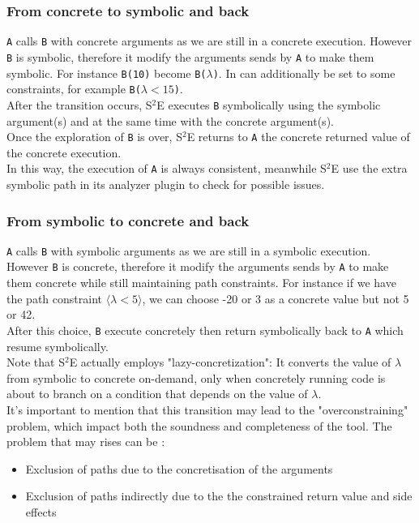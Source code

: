 \documentclass[11pt]{article}
\begin{document}
    		\subsubsection*{From concrete to symbolic and back}
    			\texttt{A} calls \texttt{B} with concrete arguments as we are still in a concrete execution. However \texttt{B} is symbolic, therefore it modify the arguments sends by \texttt{A} to make them symbolic. For instance \texttt{B(10)} become \texttt{B($\lambda$)}. In can additionally be set to some constraints, for example \texttt{B($\lambda < 15$)}.\\
    			After the transition occurs, S$^2$E executes \texttt{B} symbolically using the symbolic argument(s) and at the same time with the concrete argument(s).\\
    			Once the exploration of \texttt{B} is over, S$^2$E returns to \texttt{A} the concrete returned value of the concrete execution.\\
    			In this way, the execution of \texttt{A} is always consistent, meanwhile S$^2$E use the extra symbolic path in its analyzer plugin to check for possible issues.
    			
    		\subsubsection*{From symbolic to concrete and back}
    			\texttt{A} calls \texttt{B} with symbolic arguments as we are still in a symbolic execution. However \texttt{B} is concrete, therefore it modify the arguments sends by \texttt{A} to make them concrete while still maintaining path constraints. For instance if we have the path constraint  $\langle \lambda < 5 \rangle$, we can choose -20 or 3 as a concrete value but not 5 or 42.\\
    			After this choice, \texttt{B} execute concretely then return symbolically back to \texttt{A} which resume symbolically.\\
    			
    			Note that S$^2$E actually employs "lazy-concretization": It converts the value of $\lambda$ from symbolic to concrete on-demand, only when concretely running code is about to branch on a condition that depends on the value of $\lambda$. \\
    			
    			It's important to mention that this transition may lead to the "overconstraining" problem, which impact both the soundness and completeness of the tool. The problem that may rises can be :
    			\begin{itemize}
    				\item Exclusion of paths due to the concretisation of the arguments
    				\item Exclusion of paths indirectly due to the the constrained return value
and side effects
    			\end{itemize}
    		
\end{document}
